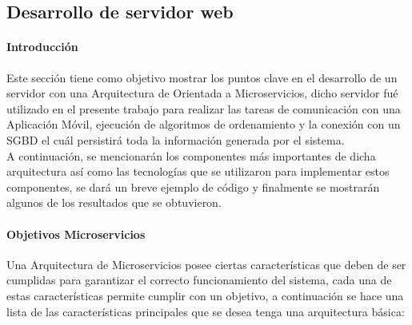 \subsection{Desarrollo de servidor web}

\paragraph{Introducción}
Este sección tiene como objetivo mostrar los puntos clave en el desarrollo de un servidor con una Arquitectura de Orientada a Microservicios, dicho servidor fué utilizado en el presente trabajo para realizar las tareas de comunicación con una Aplicación Móvil, ejecución de algoritmos de ordenamiento y la conexión con un SGBD el cuál persistirá toda la información generada por el sistema. \\

A continuación, se mencionarán los componentes más importantes de dicha arquitectura así como las tecnologías que se utilizaron para implementar estos componentes, se dará un breve ejemplo de código y finalmente se mostrarán algunos de los resultados que se obtuvieron. \\

\paragraph{Objetivos Microservicios}
Una Arquitectura de Microservicios posee ciertas características que deben de ser cumplidas para garantizar el correcto funcionamiento del sistema, cada una de estas características permite cumplir con un objetivo, a continuación se hace una lista de las características principales que se desea tenga una arquitectura básica:


